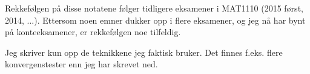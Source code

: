 Rekkefølgen på disse notatene følger tidligere eksamener
i MAT1110 (2015 først, 2014, ...).
Ettersom noen emner dukker opp i flere eksamener, og jeg nå har bynt på
konteeksamener, er rekkefølgen noe tilfeldig.

Jeg skriver kun opp de teknikkene jeg faktisk bruker.
Det finnes f.eks. flere konvergenstester enn jeg har skrevet ned.
